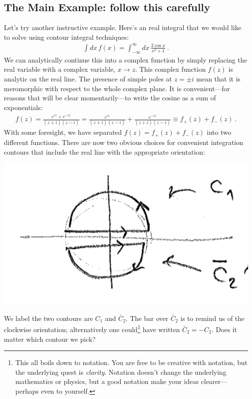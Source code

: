 \subsection{The Main Example: follow this carefully}
Let's try another instructive example. Here's an real integral that we would like to solve using contour integral techniques:
\begin{align}
\int dx\, f(x) = \int_{-\infty}^\infty  dx\,
\frac{2\cos x}{x^2+1} \ .
\end{align}
We can analytically continue this into a complex function by simply replacing the real variable with a complex variable, $x\to z$. This complex function $f(z)$ is analytic on the real line. The presence of simple poles at $z=\pm i$ mean that it is meromorphic with respect to the whole complex plane. It is convenient---for reasons that will be clear momentarily---to write the cosine as a sum of exponentials:
\begin{align}
	f(z) 
	= \frac{e^{iz}+e^{-iz}}{(z+i)(z-i)} 
	= \frac{e^{iz}}{(z+i)(z-i)} + \frac{e^{-iz}}{(z+i)(z-i)} 
	\equiv f_+(z) + f_-(z)
	\ .
\end{align}
With some foresight, we have separated $f(z)=f_+(z)+f_-(z)$ into two different functions. 
%
There are now two obvious choices for convenient integration contours that include the real line with the appropriate orientation:
\begin{center}
\includegraphics[width=.5\textwidth]{figures/Lec_2017_14_whichcontour.png}
\end{center}
We label the two contours are $C_1$ and $\bar C_2$. The bar over $\bar C_2$ is to remind us of the clockwise orientation; alternatively one could\footnote{This all boils down to notation. You are free to be creative with notation, but the underlying quest is \emph{clarity}. Notation doesn't change the underlying mathematics or physics, but a good notation make your ideas clearer---perhaps even to yourself.} have written $\bar C_2 = -C_2$.  Does it matter which contour we pick?


